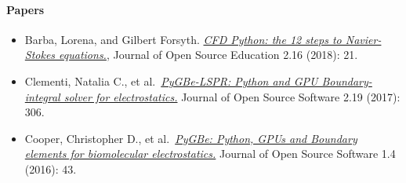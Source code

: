 \hypertarget{papers}{%
\paragraph{Papers}\label{papers}}

\begin{itemize}
\tightlist
\item
  Barba, Lorena, and Gilbert Forsyth.
  \href{https://jose.theoj.org/papers/10.21105/jose.00021.pdf}{\emph{CFD
  Python: the 12 steps to Navier-Stokes equations.}}, Journal of Open
  Source Education 2.16 (2018): 21.
\item
  Clementi, Natalia C., et
  al.~\href{https://joss.theoj.org/papers/10.21105/joss.00306.pdf}{\emph{PyGBe-LSPR:
  Python and GPU Boundary-integral solver for electrostatics.}} Journal
  of Open Source Software 2.19 (2017): 306.
\item
  Cooper, Christopher D., et
  al.~\href{https://joss.theoj.org/papers/10.21105/joss.00043.pdf}{\emph{PyGBe:
  Python, GPUs and Boundary elements for biomolecular electrostatics.}}
  Journal of Open Source Software 1.4 (2016): 43.
\end{itemize}
